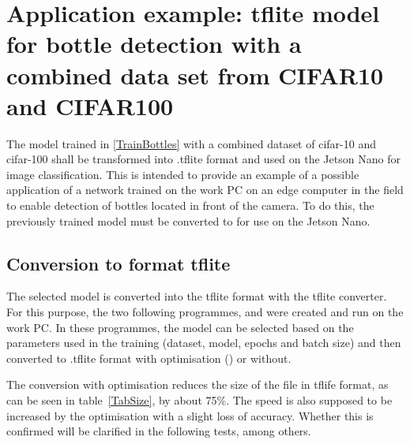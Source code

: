 %
%
%


\section{Application example: tflite model for bottle detection with a combined data set from CIFAR10 and CIFAR100}

The model trained in \ref{TrainBottles} with a combined dataset of \ac{cifar}-10 and \ac{cifar}-100 shall be transformed into .tflite format and used on the Jetson Nano for image classification. This is intended to provide an example of a possible application of a network trained on the work PC on an edge computer in the field to enable detection of bottles located in front of the camera. To do this, the previously trained model must be converted to  for use on the Jetson Nano.

\subsection{Conversion to  format tflite}

The selected model is converted into the tflite format with the tflite converter. For this purpose, the two following programmes,  and  were created and run on the work PC. In these programmes, the model can be selected based on the parameters used in the training (dataset, model, epochs and batch size) and then converted to .tflite format with optimisation () or without.

\begin{code}
  
  

  \caption{Conversion to  format tflite}
\end{code}

The conversion with optimisation reduces the size of the file in tflife format, as can be seen in table~\ref{TabSize}, by about 75\%. The speed is also supposed to be increased by the optimisation with a slight loss of accuracy. Whether this is confirmed will be clarified in the following tests, among others.


